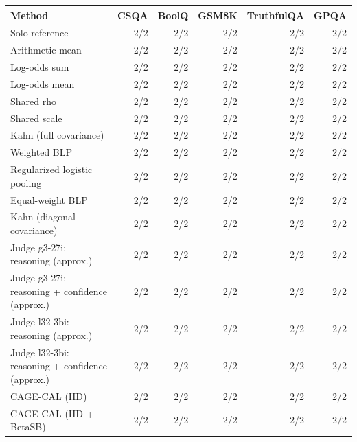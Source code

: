 \begin{tabular}{lrrrrr}
\toprule
Method & CSQA & BoolQ & GSM8K & TruthfulQA & GPQA \\
\midrule
Solo reference & 2/2 & 2/2 & 2/2 & 2/2 & 2/2 \\
Arithmetic mean & 2/2 & 2/2 & 2/2 & 2/2 & 2/2 \\
Log-odds sum & 2/2 & 2/2 & 2/2 & 2/2 & 2/2 \\
Log-odds mean & 2/2 & 2/2 & 2/2 & 2/2 & 2/2 \\
Shared rho & 2/2 & 2/2 & 2/2 & 2/2 & 2/2 \\
Shared scale & 2/2 & 2/2 & 2/2 & 2/2 & 2/2 \\
Kahn (full covariance) & 2/2 & 2/2 & 2/2 & 2/2 & 2/2 \\
Weighted BLP & 2/2 & 2/2 & 2/2 & 2/2 & 2/2 \\
Regularized logistic pooling & 2/2 & 2/2 & 2/2 & 2/2 & 2/2 \\
Equal-weight BLP & 2/2 & 2/2 & 2/2 & 2/2 & 2/2 \\
Kahn (diagonal covariance) & 2/2 & 2/2 & 2/2 & 2/2 & 2/2 \\
Judge g3-27i: reasoning (approx.) & 2/2 & 2/2 & 2/2 & 2/2 & 2/2 \\
Judge g3-27i: reasoning + confidence (approx.) & 2/2 & 2/2 & 2/2 & 2/2 & 2/2 \\
Judge l32-3bi: reasoning (approx.) & 2/2 & 2/2 & 2/2 & 2/2 & 2/2 \\
Judge l32-3bi: reasoning + confidence (approx.) & 2/2 & 2/2 & 2/2 & 2/2 & 2/2 \\
CAGE-CAL (IID) & 2/2 & 2/2 & 2/2 & 2/2 & 2/2 \\
CAGE-CAL (IID + BetaSB) & 2/2 & 2/2 & 2/2 & 2/2 & 2/2 \\
\bottomrule
\end{tabular}
